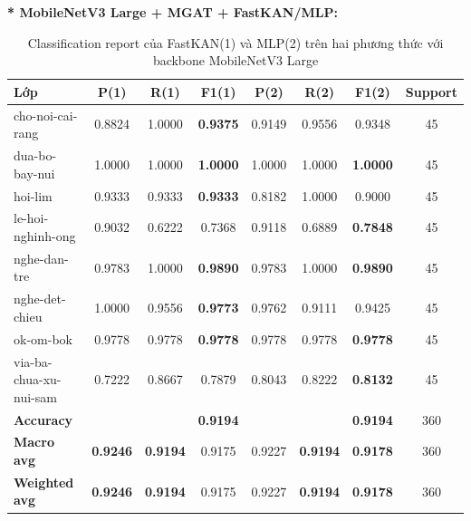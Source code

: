 \newpage
\textbf{* MobileNetV3 Large + MGAT + FastKAN/MLP:}
\begin{table}[H]
\centering
\renewcommand{\arraystretch}{1.08}
\caption{\centering Classification report của FastKAN(1) và MLP(2) trên hai phương thức với backbone MobileNetV3 Large}
\begin{tabular}{lccccccc}
\hline \textbf{Lớp} & \textbf{P(1)} & \textbf{R(1)} & \textbf{F1(1)} & \textbf{P(2)} & \textbf{R(2)} & \textbf{F1(2)} & \textbf{Support} \\ \hline

cho-noi-cai-rang 
& 0.8824 & 1.0000 & \textbf{0.9375} 
& 0.9149 & 0.9556 & 0.9348 & 45 \\

dua-bo-bay-nui
& 1.0000 & 1.0000 & \textbf{1.0000}
& 1.0000 & 1.0000 & \textbf{1.0000} & 45 \\

hoi-lim 
& 0.9333 & 0.9333 & \textbf{0.9333} 
& 0.8182 & 1.0000 & 0.9000 & 45 \\

le-hoi-nghinh-ong
& 0.9032 & 0.6222 & 0.7368 
& 0.9118 & 0.6889 & \textbf{0.7848} & 45 \\

nghe-dan-tre 
& 0.9783 & 1.0000 & \textbf{0.9890} 
& 0.9783 & 1.0000 & \textbf{0.9890} & 45 \\

nghe-det-chieu 
& 1.0000 & 0.9556 & \textbf{0.9773} 
& 0.9762 & 0.9111 & 0.9425 & 45 \\

ok-om-bok 
& 0.9778 & 0.9778 & \textbf{0.9778} 
& 0.9778 & 0.9778 & \textbf{0.9778} & 45 \\

via-ba-chua-xu-nui-sam
& 0.7222 & 0.8667 & 0.7879 
& 0.8043 & 0.8222 & \textbf{0.8132} & 45 \\
\hline

\textbf{Accuracy}
& & & \textbf{0.9194}
& & & \textbf{0.9194} & 360 \\

\textbf{Macro avg} 
& \textbf{0.9246} & \textbf{0.9194} & 0.9175 
& 0.9227 & \textbf{0.9194} & \textbf{0.9178} & 360 \\

\textbf{Weighted avg} 
& \textbf{0.9246} & \textbf{0.9194} & 0.9175 
& 0.9227 & \textbf{0.9194} & \textbf{0.9178} & 360 \\
\hline
\end{tabular}
\end{table}
